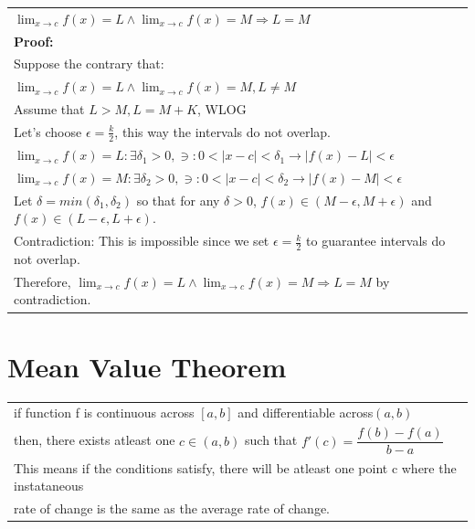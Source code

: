 \documentclass{article}
\begin{document}
\begin{center}
{\renewcommand{\arraystretch}{1.3}
\begin{tabular}{l}
$\displaystyle \lim_{x \to c} f(x) = L \land \lim_{x \to c} f(x) = M \Longrightarrow L = M$\\
\textbf{Proof:}\\
Suppose the contrary that:\\
$\displaystyle \lim_{x \to c} f(x) = L \land \lim_{x \to c} f(x) = M, L \neq M$\\
Assume that $L > M, L = M + K$, WLOG\\
Let's choose $\epsilon = \displaystyle\frac{k}{2}$, this way the intervals do not overlap.\\
$\displaystyle \lim_{x \to c} f(x) = L: \exists \delta_1 > 0, \ni: 0 < |x - c| < \delta_1 \rightarrow |f(x) - L| < \epsilon$\\
$\displaystyle \lim_{x \to c} f(x) = M: \exists \delta_2 > 0, \ni: 0 < |x - c| < \delta_2 \rightarrow |f(x) - M| < \epsilon$\\
Let $\delta = min(\delta_1, \delta_2)$ so that for any $\delta > 0$, $f(x) \in (M - \epsilon, M + \epsilon)$ and $f(x) \in (L - \epsilon, L + \epsilon)$.\\
Contradiction: This is impossible since we set $\epsilon = \displaystyle\frac{k}{2}$ to guarantee intervals do not overlap.\\
Therefore, $\displaystyle \lim_{x \to c} f(x) = L \land \lim_{x \to c} f(x) = M \Longrightarrow L = M$ by contradiction.
\end{tabular}}
\end{center}


\section{Mean Value Theorem}

\begin{tabular}{l}
if function f is continuous across $[a,b]$ and differentiable across$(a,b)$\\
then, there exists atleast one $c \in (a,b)$ such that $f'(c) = \dfrac{f(b) - f(a)}{b - a}$\\
This means if the conditions satisfy, there will be atleast one point c where the instataneous\\
rate of change is the same as the average rate of change.\\
\end{tabular}
\end{document}
